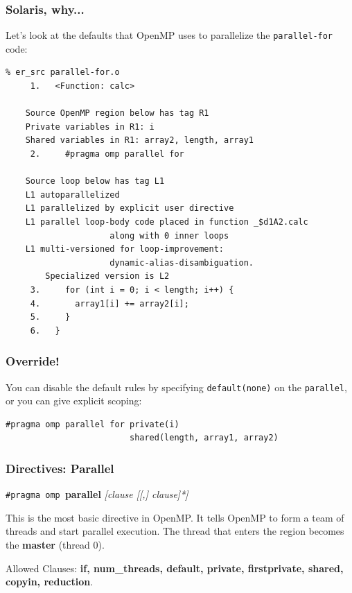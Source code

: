 \begin{frame}[fragile]
  \frametitle{Solaris, why...}


Let's look at the defaults that OpenMP uses to parallelize the {\tt parallel-for} code:
\begin{lstlisting}
% er_src parallel-for.o
     1.   <Function: calc>
    
    Source OpenMP region below has tag R1
    Private variables in R1: i
    Shared variables in R1: array2, length, array1
     2.     #pragma omp parallel for

    Source loop below has tag L1
    L1 autoparallelized
    L1 parallelized by explicit user directive
    L1 parallel loop-body code placed in function _$d1A2.calc 
                     along with 0 inner loops
    L1 multi-versioned for loop-improvement:
                     dynamic-alias-disambiguation. 
        Specialized version is L2
     3.     for (int i = 0; i < length; i++) {
     4.       array1[i] += array2[i];
     5.     }
     6.   }
\end{lstlisting}

\end{frame}


\begin{frame}[fragile]
  \frametitle{Override!}
  
You can disable the default rules
by specifying {\tt default(none)} on the {\tt parallel},
or you can give explicit scoping:

\begin{lstlisting}
#pragma omp parallel for private(i) 
                         shared(length, array1, array2)
\end{lstlisting}



\end{frame}


\begin{frame}
\frametitle{Directives: Parallel}

  \begin{center}
    {\tt \#pragma omp }{\bf parallel} {\it [clause [[,] clause]*]}
  \end{center}

This is the most basic directive in OpenMP.
It tells OpenMP to form a team of threads and start parallel execution.
The thread that enters the region becomes the {\bf master} (thread 0).

Allowed Clauses: {\bf if, num\_threads, default, private, firstprivate,
    shared, copyin, reduction}.

\end{frame}


